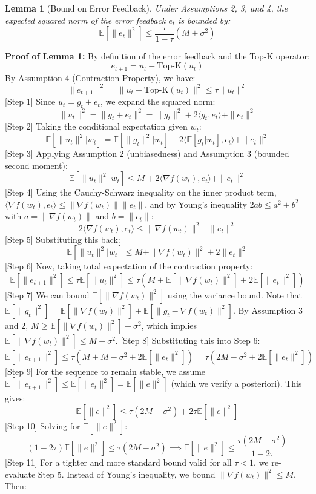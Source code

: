 \documentclass{article}
\newtheorem{lemma}[theorem]{Lemma}
\newcommand{\E}{\mathbb{E}}
\begin{document}
\begin{lemma}[Bound on Error Feedback]
Under Assumptions 2, 3, and 4, the expected squared norm of the error feedback $e_t$ is bounded by:
$$ \E[\|e_t\|^2] \leq \frac{\tau}{1-\tau} (M + \sigma^2) $$
\end{lemma}
\textbf{Proof of Lemma 1:}
By definition of the error feedback and the Top-K operator:
$$ e_{t+1} = u_t - \text{Top-K}(u_t) $$
By Assumption 4 (Contraction Property), we have:
$$ \|e_{t+1}\|^2 = \|u_t - \text{Top-K}(u_t)\|^2 \leq \tau \|u_t\|^2 $$
[Step 1] Since $u_t = g_t + e_t$, we expand the squared norm:
$$ \|u_t\|^2 = \|g_t + e_t\|^2 = \|g_t\|^2 + 2\langle g_t, e_t \rangle + \|e_t\|^2 $$
[Step 2] Taking the conditional expectation given $w_t$:
$$ \E[\|u_t\|^2 | w_t] = \E[\|g_t\|^2 | w_t] + 2 \langle \E[g_t | w_t], e_t \rangle + \|e_t\|^2 $$
[Step 3] Applying Assumption 2 (unbiasedness) and Assumption 3 (bounded second moment):
$$ \E[\|u_t\|^2 | w_t] \leq M + 2 \langle \nabla f(w_t), e_t \rangle + \|e_t\|^2 $$
[Step 4] Using the Cauchy-Schwarz inequality on the inner product term, $\langle \nabla f(w_t), e_t \rangle \leq \|\nabla f(w_t)\| \|e_t\|$, and by Young's inequality $2ab \leq a^2 + b^2$ with $a=\|\nabla f(w_t)\|$ and $b=\|e_t\|$:
$$ 2 \langle \nabla f(w_t), e_t \rangle \leq \|\nabla f(w_t)\|^2 + \|e_t\|^2 $$
[Step 5] Substituting this back:
$$ \E[\|u_t\|^2 | w_t] \leq M + \|\nabla f(w_t)\|^2 + 2\|e_t\|^2 $$
[Step 6] Now, taking total expectation of the contraction property:
$$ \E[\|e_{t+1}\|^2] \leq \tau \E[\|u_t\|^2] \leq \tau \left( M + \E[\|\nabla f(w_t)\|^2] + 2\E[\|e_t\|^2] \right) $$
[Step 7] We can bound $\E[\|\nabla f(w_t)\|^2]$ using the variance bound. Note that $\E[\|g_t\|^2] = \E[\|\nabla f(w_t)\|^2] + \E[\|g_t - \nabla f(w_t)\|^2]$. By Assumption 3 and 2, $M \geq \E[\|\nabla f(w_t)\|^2] + \sigma^2$, which implies $\E[\|\nabla f(w_t)\|^2] \leq M - \sigma^2$.
[Step 8] Substituting this into Step 6:
$$ \E[\|e_{t+1}\|^2] \leq \tau \left( M + M - \sigma^2 + 2\E[\|e_t\|^2] \right) = \tau \left( 2M - \sigma^2 + 2\E[\|e_t\|^2] \right) $$
[Step 9] For the sequence to remain stable, we assume $\E[\|e_{t+1}\|^2] \leq \E[\|e_t\|^2] = \E[\|e\|^2]$ (which we verify a posteriori). This gives:
$$ \E[\|e\|^2] \leq \tau (2M - \sigma^2) + 2\tau \E[\|e\|^2] $$
[Step 10] Solving for $\E[\|e\|^2]$:
$$ (1 - 2\tau) \E[\|e\|^2] \leq \tau (2M - \sigma^2) \implies \E[\|e\|^2] \leq \frac{\tau (2M - \sigma^2)}{1 - 2\tau} $$
[Step 11] For a tighter and more standard bound valid for all $\tau < 1$, we re-evaluate Step 5. Instead of Young's inequality, we bound $\|\nabla f(w_t)\|^2 \leq M$. Then:
\end{document}
